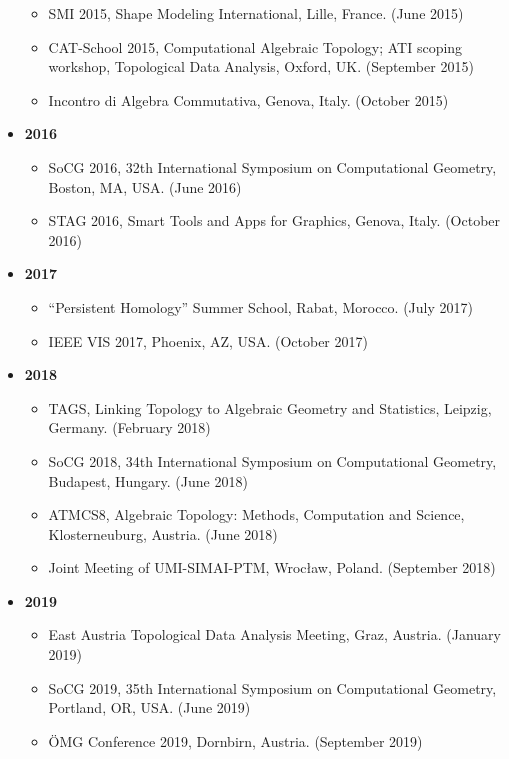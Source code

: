 \documentclass[11pt]{article}
\begin{document}
\begin{itemize}
\begin{itemize}
\item{SMI 2015, Shape Modeling International, Lille, France. (June 2015)}
\item{CAT-School 2015, Computational Algebraic Topology; ATI scoping workshop, Topological Data Analysis, Oxford, UK. (September 2015)}
\item{Incontro di Algebra Commutativa, Genova, Italy. (October 2015)}
\end{itemize}
\vspace*{0.2ex}
\item[ ]{\bf 2016}
\begin{itemize}
\item{SoCG 2016, 32th International Symposium on Computational Geometry, Boston, MA, USA. (June 2016)}
\item{STAG 2016, Smart Tools and Apps for Graphics, Genova, Italy. (October 2016)}
\end{itemize}
\vspace*{0.2ex}
\item[ ]{\bf 2017}
\begin{itemize}
\item{``Persistent Homology'' Summer School, Rabat, Morocco. (July 2017)}
\item{IEEE VIS 2017, Phoenix, AZ, USA. (October 2017)}
\end{itemize}
\vspace*{0.2ex}
\item[ ]{\bf 2018}
\begin{itemize}
\item{TAGS, Linking Topology to Algebraic Geometry and Statistics, Leipzig, Germany. (February 2018)}
\item{SoCG 2018, 34th International Symposium on Computational Geometry, Budapest, Hungary. (June 2018)}
\item{ATMCS8, Algebraic Topology: Methods, Computation and Science, Klosterneuburg, Austria. (June 2018)}
\item{Joint Meeting of UMI-SIMAI-PTM, Wroc\l{}aw, Poland. (September 2018)}
\end{itemize}
\vspace*{0.2ex}
\item[ ]{\bf 2019}
\begin{itemize}
\item{East Austria Topological Data Analysis Meeting, Graz, Austria. (January 2019)}
\item{SoCG 2019, 35th International Symposium on Computational Geometry, Portland, OR, USA. (June 2019)}
\item{{\"O}MG Conference 2019, Dornbirn, Austria. (September 2019)}

\end{itemize}
\end{itemize}
\end{document}

